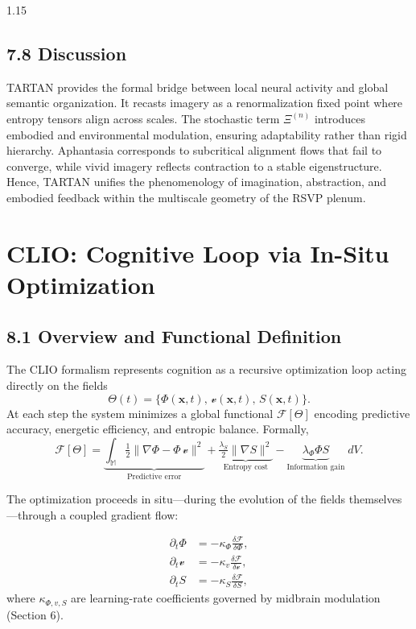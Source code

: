 \documentclass[12pt,a4paper]{article}
\begin{document}
\begin{spacing}{1.15}
\subsection{7.8 Discussion}

TARTAN provides the formal bridge between local neural activity and global semantic organization.  
It recasts imagery as a renormalization fixed point where entropy tensors align across scales.  
The stochastic term $\Xi^{(n)}$ introduces embodied and environmental modulation, ensuring adaptability rather than rigid hierarchy.  
Aphantasia corresponds to subcritical alignment flows that fail to converge, while vivid imagery reflects contraction to a stable eigenstructure.  
Hence, TARTAN unifies the phenomenology of imagination, abstraction, and embodied feedback within the multiscale geometry of the RSVP plenum.

\section{CLIO: Cognitive Loop via In-Situ Optimization}

\subsection{8.1 Overview and Functional Definition}

The CLIO formalism represents cognition as a recursive optimization loop acting directly on the fields
\[
\Theta(t)=\{\Phi(\mathbf{x},t),\,\boldsymbol{\mathcal v}(\mathbf{x},t),\,S(\mathbf{x},t)\}.
\]
At each step the system minimizes a global functional $\mathcal{F}[\Theta]$ encoding predictive accuracy, energetic efficiency, and entropic balance.  
Formally,
\begin{equation}
\mathcal{F}[\Theta]
 = \underbrace{\int_{\mathbb{M}}
     \tfrac{1}{2}\|\nabla \Phi-\Phi\,\boldsymbol{\mathcal v}\|^2}_{\text{Predictive error}}
   +\underbrace{\tfrac{\lambda_S}{2}\|\nabla S\|^2}_{\text{Entropy cost}}
   -\underbrace{\lambda_\Phi \Phi S}_{\text{Information gain}}
   \; dV .
\label{eq:clioF}
\end{equation}

The optimization proceeds in situ—during the evolution of the fields themselves—through a coupled gradient flow:

\begin{align}
\partial_t \Phi &= -\kappa_{\Phi}\frac{\delta \mathcal{F}}{\delta \Phi},\\
\partial_t \boldsymbol{\mathcal v} &= -\kappa_{v}\frac{\delta \mathcal{F}}{\delta \boldsymbol{\mathcal v}},\\
\partial_t S &= -\kappa_{S}\frac{\delta \mathcal{F}}{\delta S},
\label{eq:clioflow}
\end{align}
where $\kappa_{\Phi,v,S}$ are learning-rate coefficients governed by midbrain modulation (Section 6).


\end{spacing}
\end{document}
